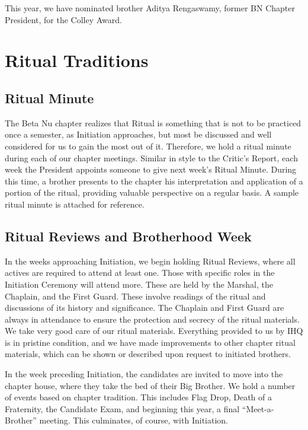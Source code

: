     This year, we have nominated brother Aditya Rengaswamy, former BN Chapter President, for the Colley Award. 
    
  \section*{Ritual Traditions}
   \subsection*{Ritual Minute}
      The Beta Nu chapter realizes that Ritual is something that is not to be practiced once a semester, as Initiation approaches, but most be discussed and well considered for us to gain the most out of it. Therefore, we hold a ritual minute during each of our chapter meetings. Similar in style to the Critic's Report, each week the President appoints someone to give next week's Ritual Minute. During this time, a brother presents to the chapter his interpretation and application of a portion of the ritual, providing valuable perspective on a regular basis. A sample ritual minute is attached for reference. \\
    
    \subsection*{Ritual Reviews and Brotherhood Week}
      In the weeks approaching Initiation, we begin holding Ritual Reviews, where all actives are required to attend at least one. Those with specific roles in the Initiation Ceremony will attend more. These are held by the Marshal, the Chaplain, and the First Guard. These involve readings of the ritual and discussions of its history and significance. The Chaplain and First Guard are always in attendance to ensure the protection and secrecy of the ritual materials. We take very good care of our ritual materials. Everything provided to us by IHQ is in pristine condition, and we have made improvements to other chapter ritual materials, which can be shown or described upon request to initiated brothers.
      
      In the week preceding Initiation, the candidates are invited to move into the chapter house, where they take the bed of their Big Brother. We hold a number of events based on chapter tradition. This includes Flag Drop, Death of a Fraternity, the Candidate Exam, and beginning this year, a final ``Meet-a-Brother'' meeting. This culminates, of course, with Initiation.
      
